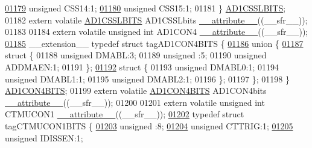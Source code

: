 \begin{DoxyCode}
\hypertarget{a00009_source_l01179}{}\hyperlink{a00008_a89250af994a2b9a7759f36e15b8c41b8}{01179}   \textcolor{keywordtype}{unsigned} CSS14:1;
\hypertarget{a00009_source_l01180}{}\hyperlink{a00008_adde564d938af376e76a2d400e47ba78e}{01180}   \textcolor{keywordtype}{unsigned} CSS15:1;
01181 \} \hyperlink{a00008_d9/dec/a00090}{AD1CSSLBITS};
01182 \textcolor{keyword}{extern} \textcolor{keyword}{volatile} \hyperlink{a00008_d9/dec/a00090}{AD1CSSLBITS} AD1CSSLbits \hyperlink{a00009_a493c46f03454991ccc5aa7a6e1dfb2a7}{\_\_attribute\_\_}((\_\_sfr\_\_));
01183 
01184 \textcolor{keyword}{extern} \textcolor{keyword}{volatile} \textcolor{keywordtype}{unsigned} \textcolor{keywordtype}{int}  AD1CON4 \hyperlink{a00009_a493c46f03454991ccc5aa7a6e1dfb2a7}{\_\_attribute\_\_}((\_\_sfr\_\_));
\hypertarget{a00009_source_l01185}{}\hyperlink{a00008}{01185} \_\_extension\_\_ \textcolor{keyword}{typedef} \textcolor{keyword}{struct }tagAD1CON4BITS \{
\hypertarget{a00009_source_l01186}{}\hyperlink{a00009}{01186}   \textcolor{keyword}{union }\{
\hypertarget{a00009_source_l01187}{}\hyperlink{a00009}{01187}     \textcolor{keyword}{struct }\{
01188       \textcolor{keywordtype}{unsigned} DMABL:3;
01189       \textcolor{keywordtype}{unsigned} :5;
01190       \textcolor{keywordtype}{unsigned} ADDMAEN:1;
01191     \};
\hypertarget{a00009_source_l01192}{}\hyperlink{a00009}{01192}     \textcolor{keyword}{struct }\{
01193       \textcolor{keywordtype}{unsigned} DMABL0:1;
01194       \textcolor{keywordtype}{unsigned} DMABL1:1;
01195       \textcolor{keywordtype}{unsigned} DMABL2:1;
01196     \};
01197   \};
01198 \} \hyperlink{a00008_da/d2a/a00086}{AD1CON4BITS};
01199 \textcolor{keyword}{extern} \textcolor{keyword}{volatile} \hyperlink{a00008_da/d2a/a00086}{AD1CON4BITS} AD1CON4bits \hyperlink{a00009_a493c46f03454991ccc5aa7a6e1dfb2a7}{\_\_attribute\_\_}((\_\_sfr\_\_));
01200 
01201 \textcolor{keyword}{extern} \textcolor{keyword}{volatile} \textcolor{keywordtype}{unsigned} \textcolor{keywordtype}{int}  CTMUCON1 \hyperlink{a00009_a493c46f03454991ccc5aa7a6e1dfb2a7}{\_\_attribute\_\_}((\_\_sfr\_\_));
\hypertarget{a00009_source_l01202}{}\hyperlink{a00008}{01202} \textcolor{keyword}{typedef} \textcolor{keyword}{struct }tagCTMUCON1BITS \{
\hypertarget{a00009_source_l01203}{}\hyperlink{a00008_adf71f3d8410c1f1dbbc96680a92c49af}{01203}   \textcolor{keywordtype}{unsigned} :8;
\hypertarget{a00009_source_l01204}{}\hyperlink{a00008_a7b5bdaef4207a8c492c613dbd8d4c242}{01204}   \textcolor{keywordtype}{unsigned} CTTRIG:1;
\hypertarget{a00009_source_l01205}{}\hyperlink{a00008_a156749521a1fd62d08b18d5ee39e54b9}{01205}   \textcolor{keywordtype}{unsigned} IDISSEN:1;

\end{DoxyCode}
